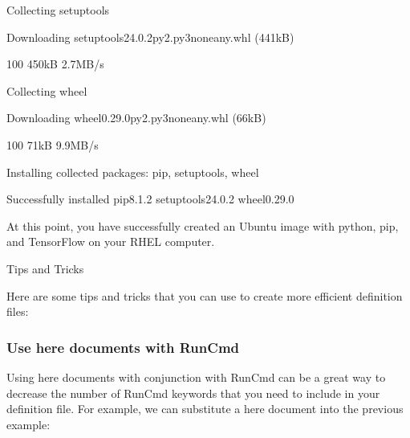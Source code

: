 \documentclass[letterpaper,10pt,english]{sphinxmanual}
\begin{document}
\begin{sphinxVerbatim}[commandchars=\\\{\}]
Collecting setuptools

Downloading setuptools\PYGZhy{}24.0.2\PYGZhy{}py2.py3\PYGZhy{}none\PYGZhy{}any.whl (441kB)

100\PYGZpc{} \textbar{}\PYGZsh{}\PYGZsh{}\PYGZsh{}\PYGZsh{}\PYGZsh{}\PYGZsh{}\PYGZsh{}\PYGZsh{}\PYGZsh{}\PYGZsh{}\PYGZsh{}\PYGZsh{}\PYGZsh{}\PYGZsh{}\PYGZsh{}\PYGZsh{}\PYGZsh{}\PYGZsh{}\PYGZsh{}\PYGZsh{}\PYGZsh{}\PYGZsh{}\PYGZsh{}\PYGZsh{}\PYGZsh{}\PYGZsh{}\PYGZsh{}\PYGZsh{}\PYGZsh{}\PYGZsh{}\PYGZsh{}\PYGZsh{}\textbar{} 450kB 2.7MB/s

Collecting wheel

Downloading wheel\PYGZhy{}0.29.0\PYGZhy{}py2.py3\PYGZhy{}none\PYGZhy{}any.whl (66kB)

100\PYGZpc{} \textbar{}\PYGZsh{}\PYGZsh{}\PYGZsh{}\PYGZsh{}\PYGZsh{}\PYGZsh{}\PYGZsh{}\PYGZsh{}\PYGZsh{}\PYGZsh{}\PYGZsh{}\PYGZsh{}\PYGZsh{}\PYGZsh{}\PYGZsh{}\PYGZsh{}\PYGZsh{}\PYGZsh{}\PYGZsh{}\PYGZsh{}\PYGZsh{}\PYGZsh{}\PYGZsh{}\PYGZsh{}\PYGZsh{}\PYGZsh{}\PYGZsh{}\PYGZsh{}\PYGZsh{}\PYGZsh{}\PYGZsh{}\PYGZsh{}\textbar{} 71kB 9.9MB/s

Installing collected packages: pip, setuptools, wheel

Successfully installed pip\PYGZhy{}8.1.2 setuptools\PYGZhy{}24.0.2 wheel\PYGZhy{}0.29.0

At this point, you have successfully created an Ubuntu image with \PYGZsq{}python\PYGZsq{}, \PYGZsq{}pip\PYGZsq{}, and \PYGZsq{}TensorFlow\PYGZsq{} on your RHEL computer.

Tips and Tricks

Here are some tips and tricks that you can use to create more efficient definition files:
\end{sphinxVerbatim}


\subsubsection{Use here documents with RunCmd}
\label{\detokenize{appendix:use-here-documents-with-runcmd}}
Using here documents with conjunction with RunCmd can be a great way to decrease the number of RunCmd keywords that you need to include
in your definition file. For example, we can substitute a here document into the previous example:
\end{document}
